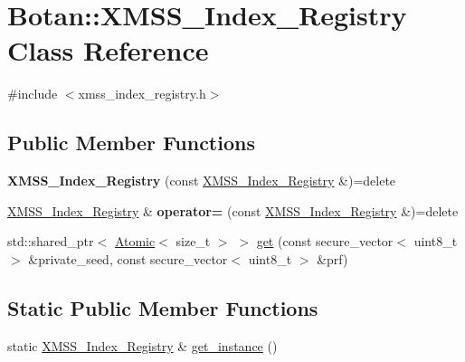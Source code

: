 \hypertarget{class_botan_1_1_x_m_s_s___index___registry}{}\section{Botan\+:\+:X\+M\+S\+S\+\_\+\+Index\+\_\+\+Registry Class Reference}
\label{class_botan_1_1_x_m_s_s___index___registry}


{\ttfamily \#include $<$xmss\+\_\+index\+\_\+registry.\+h$>$}

\subsection*{Public Member Functions}
\begin{DoxyCompactItemize}
\item 
\mbox{\label{class_botan_1_1_x_m_s_s___index___registry_add9f8d6bd8f776b4ffaa8b446a28a918}} 
{\bfseries X\+M\+S\+S\+\_\+\+Index\+\_\+\+Registry} (const \mbox{\hyperlink{class_botan_1_1_x_m_s_s___index___registry}{X\+M\+S\+S\+\_\+\+Index\+\_\+\+Registry}} \&)=delete
\item 
\mbox{\label{class_botan_1_1_x_m_s_s___index___registry_a83a4bf4d25f6a03e25021aeff1e32684}} 
\mbox{\hyperlink{class_botan_1_1_x_m_s_s___index___registry}{X\+M\+S\+S\+\_\+\+Index\+\_\+\+Registry}} \& {\bfseries operator=} (const \mbox{\hyperlink{class_botan_1_1_x_m_s_s___index___registry}{X\+M\+S\+S\+\_\+\+Index\+\_\+\+Registry}} \&)=delete
\item 
std\+::shared\+\_\+ptr$<$ \mbox{\hyperlink{class_botan_1_1_atomic}{Atomic}}$<$ size\+\_\+t $>$ $>$ \mbox{\hyperlink{class_botan_1_1_x_m_s_s___index___registry_a10f269ceb92c6fa9c0916708c399d6c2}{get}} (const secure\+\_\+vector$<$ uint8\+\_\+t $>$ \&private\+\_\+seed, const secure\+\_\+vector$<$ uint8\+\_\+t $>$ \&prf)
\end{DoxyCompactItemize}
\subsection*{Static Public Member Functions}
\begin{DoxyCompactItemize}
\item 
static \mbox{\hyperlink{class_botan_1_1_x_m_s_s___index___registry}{X\+M\+S\+S\+\_\+\+Index\+\_\+\+Registry}} \& \mbox{\hyperlink{class_botan_1_1_x_m_s_s___index___registry_a1f1342ed0b520a67ae8165d3cf0e989e}{get\+\_\+instance}} ()
\end{DoxyCompactItemize}


